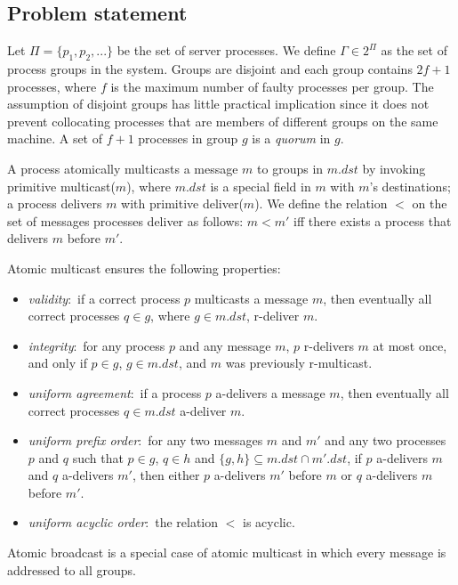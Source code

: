 \subsection{Problem statement}
\label{sec:amcast}

Let $\Pi = \{p_1, p_2, ...\}$ be the set of server processes.
We define $\Gamma \in 2^{\Pi}$ as the set of process groups in the system. 
Groups are disjoint and each group contains $2f+1$ processes, where $f$ is the maximum number of faulty processes per group.  
The assumption of disjoint groups has little practical implication since it does not prevent collocating processes that are members of different groups on the same machine.
A set of $f + 1$ processes in group $g$ is a \emph{quorum} in $g$.

A process atomically multicasts a message $m$ to groups in $m.dst$ by invoking primitive multicast($m$), where $m.dst$ is a special field in $m$ with $m$'s destinations; a process delivers $m$ with primitive deliver($m$). 
We define the relation $<$ on the set of messages processes deliver as follows: $m < m'$ iff there exists a process that delivers $m$ before $m'$. 

Atomic multicast ensures the following properties: 
\begin{itemize}
\item \textit{validity}:~if a correct process $p$ multicasts a message $m$, then eventually all correct processes $q \in g$, where $g \in m.\mathit{dst}$, r-deliver $m$.
\item \textit{integrity}:~for any process $p$ and any message $m$, $p$ r-delivers $m$ at most once, and only if $p \in g$, $g \in m.\mathit{dst}$, and $m$ was previously r-multicast.
\item \textit{uniform agreement}:~if a process $p$ a-delivers a message $m$, then eventually all correct processes $q\in m.\mathit{dst}$ a-deliver $m$.
\item \textit{uniform prefix order}:~for any two messages $m$ and $m'$ and any two processes $p$ and $q$ such that $p \in g$, $q \in h$ and $\{ g, h \} \subseteq m.\mathit{dst} \cap m'.\mathit{dst}$, if $p$ a-delivers $m$ and $q$ a-delivers $m'$, then either $p$ a-delivers $m'$ before $m$ or $q$ a-delivers $m$ before $m'$.
\item \textit{uniform acyclic order}:~the relation $<$ is acyclic.
\end{itemize}
Atomic broadcast is a special case of atomic multicast in which every message is addressed to all groups.

